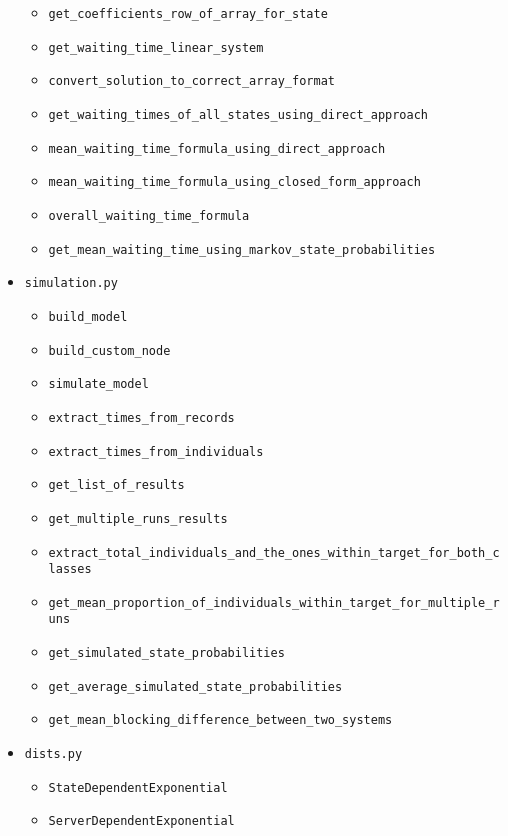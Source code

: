 \begin{itemize}
\begin{itemize}
        \item \texttt{get\_coefficients\_row\_of\_array\_for\_state}
        \item \texttt{get\_waiting\_time\_linear\_system}
        \item \texttt{convert\_solution\_to\_correct\_array\_format}
        \item \texttt{get\_waiting\_times\_of\_all\_states\_using\_direct\_approach}
        \item \texttt{mean\_waiting\_time\_formula\_using\_direct\_approach}
        \item \texttt{mean\_waiting\_time\_formula\_using\_closed\_form\_approach}
        \item \texttt{overall\_waiting\_time\_formula}
        \item \texttt{get\_mean\_waiting\_time\_using\_markov\_state\_probabilities}
    \end{itemize}
    \item \texttt{simulation.py}
    \begin{itemize}
        \item \texttt{build\_model}
        \item \texttt{build\_custom\_node}
        \item \texttt{simulate\_model}
        \item \texttt{extract\_times\_from\_records}
        \item \texttt{extract\_times\_from\_individuals}
        \item \texttt{get\_list\_of\_results}
        \item \texttt{get\_multiple\_runs\_results}
        \item \texttt{extract\_total\_individuals\_and\_the\_ones\_within\_target\_for\_both\_classes}
        \item \texttt{get\_mean\_proportion\_of\_individuals\_within\_target\_for\_multiple\_runs}
        \item \texttt{get\_simulated\_state\_probabilities}
        \item \texttt{get\_average\_simulated\_state\_probabilities}
        \item \texttt{get\_mean\_blocking\_difference\_between\_two\_systems}
    \end{itemize}
    \item \texttt{dists.py}
    \begin{itemize}
        \item \texttt{StateDependentExponential}
        \item \texttt{ServerDependentExponential}

\end{itemize}
\end{itemize}
